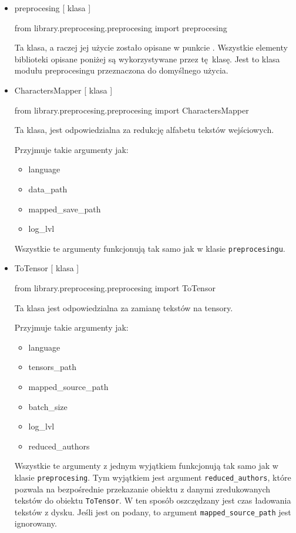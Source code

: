\begin{itemize}
	
\item  {preprocesing [ klasa ] }
\begin{import}
from library.preprocesing.preprocesing import preprocesing
\end{import}

Ta klasa, a raczej jej użycie zostało opisane w punkcie . Wszystkie elementy biblioteki opisane
poniżej są wykorzystywane przez tę klasę. Jest to klasa modułu preprocesingu przeznaczona
do domyślnego użycia.

\item  {CharactersMapper [ klasa ] }
\begin{import}
from library.preprocesing.preprocesing import CharactersMapper
\end{import}
Ta klasa, jest odpowiedzialna za redukcję alfabetu tekstów wejściowych. 

Przyjmuje takie argumenty jak: 

\begin{itemize}
	\item language
	\item data\_path
	\item mapped\_save\_path
	\item log\_lvl
\end{itemize}

Wszystkie te argumenty funkcjonują tak samo jak w klasie \texttt{preprocesingu}.


\item  {ToTensor [ klasa ] }
\begin{import}
from library.preprocesing.preprocesing import ToTensor
\end{import}
Ta klasa jest odpowiedzialna za zamianę tekstów na tensory.

Przyjmuje takie argumenty jak: 

\begin{itemize}
	\item language
	\item tensors\_path
	\item mapped\_source\_path
	\item batch\_size
	\item log\_lvl
	\item reduced\_authors
\end{itemize}

Wszystkie te argumenty z jednym wyjątkiem funkcjonują tak samo jak w klasie  \texttt{preprocesing}. 
Tym wyjątkiem jest argument \texttt{reduced\_authors}, które pozwala na bezpośrednie przekazanie obiektu z danymi 
zredukowanych tekstów do obiektu  \texttt{ToTensor}. W ten sposób oszczędzany jest czas ładowania tekstów z 
dysku. Jeśli jest on podany, to argument \texttt{mapped\_source\_path} jest ignorowany.

\end{itemize}

